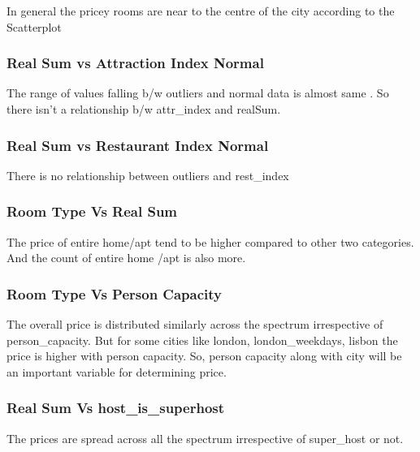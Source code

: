 \documentclass[
]{article}
\begin{document}
In general the pricey rooms are near to the centre of the city according
to the Scatterplot

\hypertarget{real-sum-vs-attraction-index-normal}{%
\subsubsection{Real Sum vs Attraction Index
Normal}\label{real-sum-vs-attraction-index-normal}}

The range of values falling b/w outliers and normal data is almost same
. So there isn't a relationship b/w attr\_index and realSum.

\hypertarget{real-sum-vs-restaurant-index-normal}{%
\subsubsection{Real Sum vs Restaurant Index
Normal}\label{real-sum-vs-restaurant-index-normal}}

There is no relationship between outliers and rest\_index

\hypertarget{room-type-vs-real-sum}{%
\subsubsection{Room Type Vs Real Sum}\label{room-type-vs-real-sum}}

The price of entire home/apt tend to be higher compared to other two
categories. And the count of entire home /apt is also more.

\hypertarget{room-type-vs-person-capacity}{%
\subsubsection{Room Type Vs Person
Capacity}\label{room-type-vs-person-capacity}}

The overall price is distributed similarly across the spectrum
irrespective of person\_capacity. But for some cities like london,
london\_weekdays, lisbon the price is higher with person capacity. So,
person capacity along with city will be an important variable for
determining price.

\hypertarget{real-sum-vs-host_is_superhost}{%
\subsubsection{Real Sum Vs
host\_is\_superhost}\label{real-sum-vs-host_is_superhost}}

The prices are spread across all the spectrum irrespective of
super\_host or not.
\end{document}
